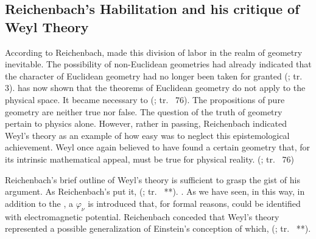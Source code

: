 \documentclass[draft]{article}
\newcommand{\phin}{\ensuremath{\varphi_\nu}\xspace}
\newcommand{\rhp}[2]{(\cite[#1]{Reichenbach1920a}; tr.\ \citeyear{Reichenbach1969} #2)\xspace}
\begin{document}



\subsection{Reichenbach's Habilitation and his critique of Weyl Theory}

According to Reichenbach, \rt made this division of labor in the realm of geometry inevitable. The possibility of non-Euclidean geometries had already indicated that the \apr character of Euclidean geometry had no longer been taken for granted \rhp{}{3}. \Rt has now shown \apo that the theorems of Euclidean geometry do not apply to the physical space. It became necessary to  \rhp{}{76}. The propositions of pure geometry are neither true nor false. The question of the truth of geometry pertain to physics alone. However, rather in passing, Reichenbach indicated Weyl's theory as an example of how easy was to neglect this epistemological achievement. Weyl once again believed to have found a certain geometry that, for its intrinsic mathematical appeal, must be true for physical reality.  \rhp{}{76}




Reichenbach's brief outline of Weyl's theory is sufficient to grasp the gist of his argument. As Reichenbach's put it,  \rhp{**}{**}. . As we have seen, in this way, in addition to the  \gmn, a  $\phin$ is introduced that, for formal reasons, could be identified with electromagnetic potential. Reichenbach conceded that Weyl's theory represented a possible generalization of Einstein's conception of \spti which,  \rhp{**}{**}. 
\end{document}
